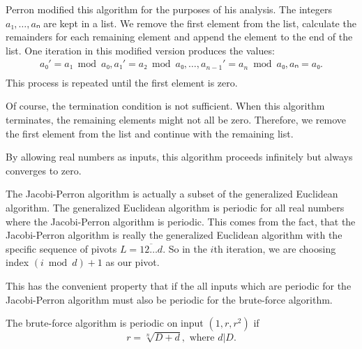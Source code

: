 Perron modified this algorithm for the purposes of his analysis.
The integers $a₁, …, aₙ$ are kept in a list.
We remove the first element from the list, calculate the remainders for each
remaining element and append the element to the end of the list.
One iteration in this modified version produces the values:
\begin{align*}
  a₀' = a₁ \bmod a₀, a₁' = a₂ \bmod a₀, …, a_{n-1}' = a_n \bmod a₀, aₙ = a₀. \\
\end{align*}
This process is repeated until the first element is zero.

Of course, the termination condition is not sufficient.
When this algorithm terminates, the remaining elements might not all be zero.
Therefore, we remove the first element from the list and continue with the
remaining list.

By allowing real numbers as inputs, this algorithm proceeds infinitely but
always converges to zero.

The Jacobi-Perron algorithm is actually a subset of the generalized Euclidean algorithm.
The generalized Euclidean algorithm is periodic for all real numbers where the Jacobi-Perron algorithm is periodic.
This comes from the fact, that the Jacobi-Perron algorithm is really the
generalized Euclidean algorithm with the specific sequence of pivots $L = \overline{12…d}$.
So in the $i$th iteration, we are choosing index $(i \bmod d) + 1$ as our pivot.

This has the convenient property that if the all inputs which are periodic for
the Jacobi-Perron algorithm must also be periodic for the brute-force algorithm.

\begin{theorem}
  The brute-force algorithm is periodic on input $(1, r, r^2)$ if
  \[
    r = \sqrt[n]{D + d}, \text{ where } d | D.
  \]
\end{theorem}

